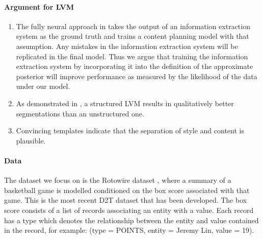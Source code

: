 \documentclass[11pt]{article}
\begin{document}
\paragraph{Argument for LVM}
\begin{enumerate}
\item The fully neural approach in \citep{puduppully2018contentselection} takes the output of
an information extraction system as the ground truth and trains a content planning model with
that assumption.
Any mistakes in the information extraction system will be replicated in the final model.
Thus we argue that training the information extraction system by incorporating it
into the definition of the approximate posterior will improve performance as measured by
the likelihood of the data under our model.
\item As demonstrated in \citep{liang2009semalign},
a structured LVM results in qualitatively better segmentations than an unstructured one.
\item Convincing templates \citep{wiseman2018template} indicate that the separation of
style and content is plausible.
\end{enumerate}


\paragraph{Data}
The dataset we focus on is the Rotowire dataset \citep{wiseman2017d2t},
where a summary of a basketball game is modelled conditioned on the box score
associated with that game.
This is the most recent D2T dataset that has been developed.
The box score consists of a list of records associating an entity with a value.
Each record has a type which denotes the relationship between the entity and value
contained in the record,
for example: (type = POINTS, entity = Jeremy Lin, value = 19).

\begin{comment}
A vein in the recent work on integrating neural network systems and latent variable models
has aimed to separate content from style.
Separate style and content, where content will come from for controllable generation.
\end{comment}
\end{document}
